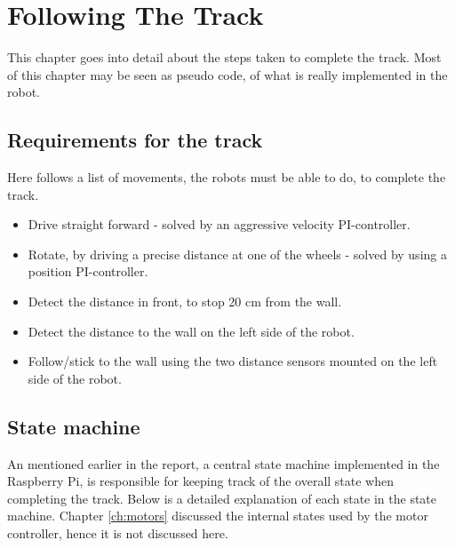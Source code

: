 \chapter{Following The Track}
\label{chap:track} 

This chapter goes into detail about the steps taken to complete the track. Most of this chapter may be seen as pseudo code, of what is really implemented in the robot.

\section{Requirements for the track}
Here follows a list of movements, the robots must be able to do, to complete the track. 

\begin{itemize}
	\item Drive straight forward - solved by an aggressive velocity PI-controller.
	\item Rotate, by driving a precise distance at one of the wheels - solved by using a position PI-controller.
	\item Detect the distance in front, to stop 20 cm from the wall.
	\item Detect the distance to the wall on the left side of the robot. 
	\item Follow/stick to the wall using the two distance sensors mounted on the left side of the robot.
\end{itemize}


\section{State machine}
An mentioned earlier in the report, a central state machine implemented in the Raspberry Pi, is responsible for keeping track of the overall state when completing the track. Below is a detailed explanation of each state in the state machine. Chapter \ref{ch:motors} discussed the internal states used by the motor controller, hence it is not discussed here.

